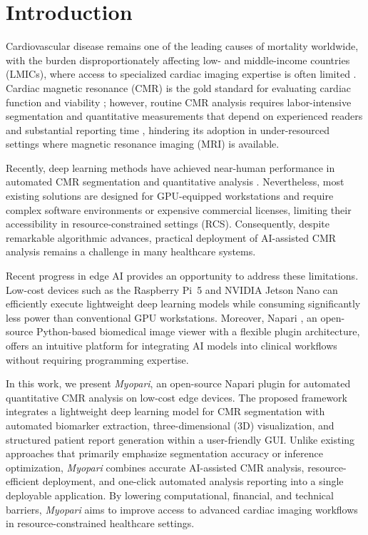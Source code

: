 \documentclass[runningheads]{llncs}
\begin{document}
\section{Introduction}

Cardiovascular disease remains one of the leading causes of mortality worldwide, with the burden disproportionately affecting low- and middle-income countries (LMICs), where access to specialized cardiac imaging expertise is often limited \cite{chong2025global}. Cardiac magnetic resonance (CMR) is the gold standard for evaluating cardiac function and viability \cite{kawel2020reference}; however, routine CMR analysis requires labor-intensive segmentation and quantitative measurements that depend on experienced readers and substantial reporting time \cite{chen2020deep}, hindering its adoption in under-resourced settings where magnetic resonance imaging (MRI) is available.

Recently, deep learning methods have achieved near-human performance in automated CMR segmentation and quantitative analysis \cite{chen2020deep,bai2018automated,U-Net,fan2023vit}. Nevertheless, most existing solutions are designed for GPU-equipped workstations and require complex software environments or expensive commercial licenses, limiting their accessibility in resource-constrained settings (RCS). Consequently, despite remarkable algorithmic advances, practical deployment of AI-assisted CMR analysis remains a challenge in many healthcare systems.

Recent progress in edge AI provides an opportunity to address these limitations. Low-cost devices such as the Raspberry Pi~5 \cite{raspberry} and NVIDIA Jetson Nano \cite{jetsonnano} can efficiently execute lightweight deep learning models while consuming significantly less power than conventional GPU workstations. Moreover, Napari \cite{napari}, an open-source Python-based biomedical image viewer with a flexible plugin architecture, offers an intuitive platform for integrating AI models into clinical workflows without requiring programming expertise.

In this work, we present \textit{Myopari}, an open-source Napari plugin for automated quantitative CMR analysis on low-cost edge devices. The proposed framework integrates a lightweight deep learning model for CMR segmentation with automated biomarker extraction, three-dimensional (3D) visualization, and structured patient report generation within a user-friendly GUI. Unlike existing approaches that primarily emphasize segmentation accuracy or inference optimization, \textit{Myopari} combines accurate AI-assisted CMR analysis, resource-efficient deployment, and one-click automated analysis reporting into a single deployable application. By lowering computational, financial, and technical barriers, \textit{Myopari} aims to improve access to advanced cardiac imaging workflows in resource-constrained healthcare settings.
\end{document}
